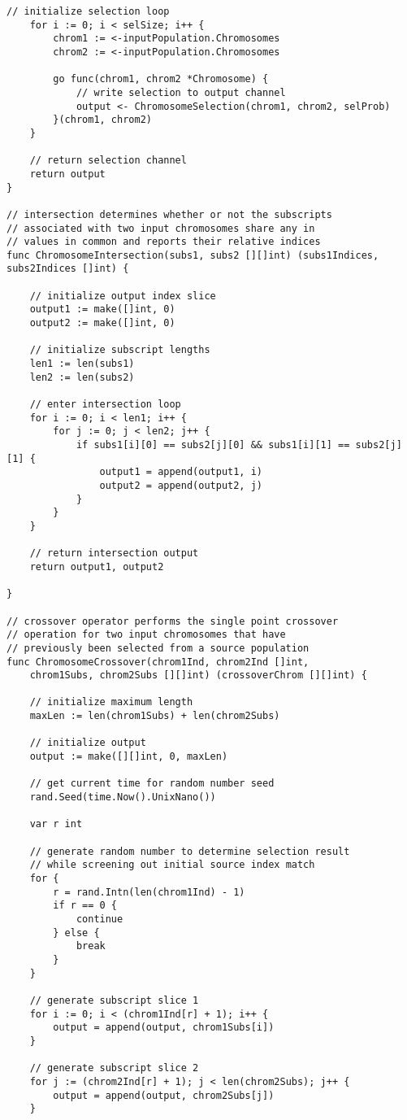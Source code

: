 \begin{lstlisting}[basicstyle=\tiny]
	// initialize selection loop
	for i := 0; i < selSize; i++ {
		chrom1 := <-inputPopulation.Chromosomes
		chrom2 := <-inputPopulation.Chromosomes

		go func(chrom1, chrom2 *Chromosome) {
			// write selection to output channel
			output <- ChromosomeSelection(chrom1, chrom2, selProb)
		}(chrom1, chrom2)
	}

	// return selection channel
	return output
}

// intersection determines whether or not the subscripts
// associated with two input chromosomes share any in
// values in common and reports their relative indices
func ChromosomeIntersection(subs1, subs2 [][]int) (subs1Indices, subs2Indices []int) {

	// initialize output index slice
	output1 := make([]int, 0)
	output2 := make([]int, 0)

	// initialize subscript lengths
	len1 := len(subs1)
	len2 := len(subs2)

	// enter intersection loop
	for i := 0; i < len1; i++ {
		for j := 0; j < len2; j++ {
			if subs1[i][0] == subs2[j][0] && subs1[i][1] == subs2[j][1] {
				output1 = append(output1, i)
				output2 = append(output2, j)
			}
		}
	}

	// return intersection output
	return output1, output2

}

// crossover operator performs the single point crossover
// operation for two input chromosomes that have
// previously been selected from a source population
func ChromosomeCrossover(chrom1Ind, chrom2Ind []int, 
    chrom1Subs, chrom2Subs [][]int) (crossoverChrom [][]int) {

	// initialize maximum length
	maxLen := len(chrom1Subs) + len(chrom2Subs)

	// initialize output
	output := make([][]int, 0, maxLen)

	// get current time for random number seed
	rand.Seed(time.Now().UnixNano())

	var r int

	// generate random number to determine selection result
	// while screening out initial source index match
	for {
		r = rand.Intn(len(chrom1Ind) - 1)
		if r == 0 {
			continue
		} else {
			break
		}
	}

	// generate subscript slice 1
	for i := 0; i < (chrom1Ind[r] + 1); i++ {
		output = append(output, chrom1Subs[i])
	}

	// generate subscript slice 2
	for j := (chrom2Ind[r] + 1); j < len(chrom2Subs); j++ {
		output = append(output, chrom2Subs[j])
	}


\end{lstlisting}
